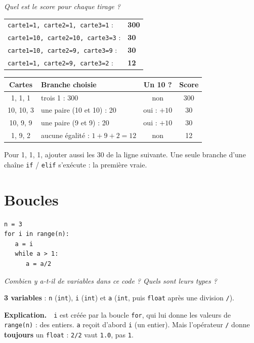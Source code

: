 \documentclass[addpoints, 11pt]{exam}
\newcommand{\enonce}[1]{\textit{#1}\par\smallskip}
\newcommand{\explication}{\par\smallskip\noindent\textbf{Explication.}\ }
\newcommand{\code}[1]{\texttt{#1}}
\DeclareRobustCommand{\_}{\textunderscore\allowbreak}
\begin{document}
\begin{questions}
\question[2] \enonce{Quel est le score pour chaque tirage ?}
\begin{reponse}
\begin{tabular}{ll}
\code{carte1=1, carte2=1, carte3=1} : & \textbf{300}\\
\code{carte1=10, carte2=10, carte3=3} : & \textbf{30}\\
\code{carte1=10, carte2=9, carte3=9} : & \textbf{30}\\
\code{carte1=1, carte2=9, carte3=2} : & \textbf{12}\\
\end{tabular}
\end{reponse}
\begin{center}
\small
\begin{tabular}{|c|l|c|c|}
\hline
Cartes & Branche choisie & Un 10 ? & Score \\ \hline
1, 1, 1 & trois 1 : 300 & non & 300 \\
10, 10, 3 & une paire (10 et 10) : 20 & oui : $+10$ & 30 \\
10, 9, 9 & une paire (9 et 9) : 20 & oui : $+10$ & 30 \\
1, 9, 2 & aucune égalité : $1 + 9 + 2 = 12$ & non & 12 \\ \hline
\end{tabular}
\end{center}
\begin{erreur}
Pour 1, 1, 1, ajouter aussi les 30 de la ligne suivante. Une seule branche d'une chaîne \code{if} / \code{elif} s'exécute : la première vraie.
\end{erreur}

\section{Boucles}

\begin{lstlisting}
n = 3
for i in range(n):
   a = i
   while a > 1:
      a = a/2
\end{lstlisting}

\question[1] \enonce{Combien y a-t-il de variables dans ce code ? Quels sont leurs types ?}
\begin{reponse}
\textbf{3 variables} : \code{n} (\code{int}), \code{i} (\code{int}) et \code{a} (\code{int}, puis \code{float} après une division \code{/}).
\end{reponse}
\explication\ \code{i} est créée par la boucle \code{for}, qui lui donne les valeurs de \code{range(n)} : des entiers. \code{a} reçoit d'abord \code{i} (un entier). Mais l'opérateur \code{/} donne \textbf{toujours} un \code{float} : \code{2/2} vaut \code{1.0}, pas \code{1}.


\end{questions}
\end{document}
